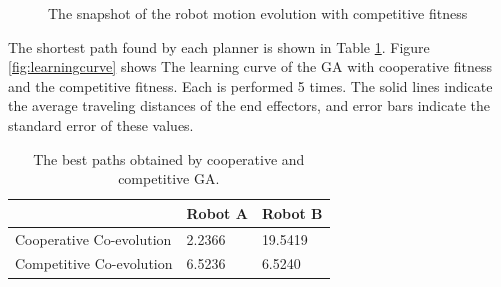 \documentclass[12pt]{article} %
\begin{document}
\begin{figure}[H] %
\caption{The snapshot of the robot motion evolution with competitive fitness}
\label{fig:competitive}
\end{figure}

The shortest path found by each planner is shown in Table \ref{tab:bestfitness}. Figure \ref{fig:learningcurve} shows The learning curve of the GA with cooperative fitness and the competitive fitness. Each is performed 5 times. The solid lines indicate the average traveling distances of the end effectors, and error bars indicate the standard error of these values. 

\begin{table}[H]
  \begin{center}
    \caption{The best paths obtained by cooperative and competitive GA.}
    \label{tab:bestfitness}
    \begin{tabular}{|l|l|l|} 
    \hline
      					          & Robot A & Robot B \\          
	\hline      
      Cooperative Co-evolution    & 2.2366  & 19.5419 \\
      Competitive Co-evolution    & 6.5236  &  6.5240 \\
	\hline      
    \end{tabular}
  \end{center}
 \end{table}
\end{document}
